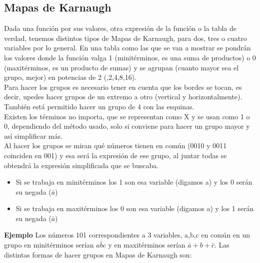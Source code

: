 \documentclass[a4paper]{article}
\begin{document}
\subsection{Mapas de Karnaugh}
Dada una función por sus valores, otra expresión de la función o la tabla de verdad, tenemos distintos tipos de Mapas de Karnaugh, para dos, tres o cuatro variables por lo general.
En una tabla como las que se van a mostrar se pondrán los valores donde la función valga 1 (minitérminos, es una suma de productos) o 0 (maxitérminos, es un producto de sumas) y se agrupan (cuanto mayor sea el grupo, mejor) en potencias de 2 (,2,4,8,16).\\
Para hacer los grupos es necesario tener en cuenta que los bordes se tocan, es decir, upedes hacer grupos de un extremo a otro (vertical y horizontalmente). También está permitido hacer un grupo de 4 con las esquinas.\\
Existen los términos no importa, que se representan como X y se usan como 1 o 0, dependiendo del método usado, solo si conviene para hacer un grupo mayor y así simplificar más.\\
Al hacer los grupos se miran qué números tienen en común (0010 y 0011 coinciden en 001) y esa será la expresión de ese grupo, al juntar todas se obtendrá la expresión simplificada que se buscaba.
\begin{itemize}
\item Si se trabaja en minitérminos los 1 son esa variable (digamos a) y los 0 serán su negada ($\bar{a}$)
\item Si se trabaja en maxitérminos los 0 son esa variable (digamos a) y los 1 serán su negada ($\bar{a}$)
\end{itemize} 
\large{\textbf{Ejemplo}}
Los números 101 correspondientes a 3 variables, a,b,c en común en un grupo en minitérminos serían $a\bar{b}c$ y en maxitérminos serían $\bar{a}+b+\bar{c}$.
\vspace{0.5cm}
Las distintas formas de hacer grupos en Mapas de Karnaugh son:
\end{document}
